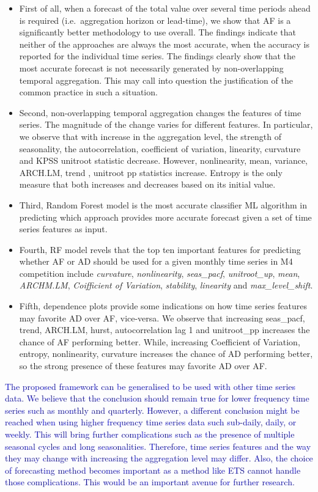 \documentclass[preprint, 3p,
authoryear]{elsarticle} %
\begin{document}
\begin{itemize}
\item
  First of all, when a forecast of the total value over several time
  periods ahead is required (i.e.~aggregation horizon or lead-time), we
  show that AF is a significantly better methodology to use overall. The
  findings indicate that neither of the approaches are always the most
  accurate, when the accuracy is reported for the individual time
  series. The findings clearly show that the most accurate forecast is
  not necessarily generated by non-overlapping temporal aggregation.
  This may call into question the justification of the common practice
  in such a situation.
\item
  Second, non-overlapping temporal aggregation changes the features of
  time series. The magnitude of the change varies for different
  features. In particular, we observe that with increase in the
  aggregation level, the strength of seasonality, the autocorrelation,
  coefficient of variation, linearity, curvature and KPSS unitroot
  statistic decrease. However, nonlinearity, mean, variance, ARCH.LM,
  trend , unitroot pp statistics increase. Entropy is the only measure
  that both increases and decreases based on its initial value.
\item
  Third, Random Forest model is the most accurate classifier ML
  algorithm in predicting which approach provides more accurate forecast
  given a set of time series features as input.
\item
  Fourth, RF model revels that the top ten important features for
  predicting whether AF or AD should be used for a given monthly time
  series in M4 competition include \emph{curvature},
  \emph{nonlinearity}, \emph{seas\_pacf}, \emph{unitroot\_up},
  \emph{mean}, \emph{ARCHM.LM}, \emph{Coifficient of Variation},
  \emph{stability}, \emph{linearity} and \emph{max\_level\_shift}.
\item
  Fifth, dependence plots provide some indications on how time series
  features may favorite AD over AF, vice-versa. We observe that
  increasing seas\_pacf, trend, ARCH.LM, hurst, autocorrelation lag 1
  and unitroot\_pp increases the chance of AF performing better. While,
  increasing Coefficient of Variation, entropy, nonlinearity, curvature
  increases the chance of AD performing better, so the strong presence
  of these features may favorite AD over AF.
\end{itemize}

\textcolor{blue}{The proposed framework can be generalised to be used with other time series data. We believe that the conclusion should remain true for lower frequency time series such as monthly and quarterly. However, a different conclusion might be reached when using higher frequency time series data such sub-daily, daily, or weekly. This will bring further complications such as the presence of multiple seasonal cycles and long seasonalities. Therefore, time series features and the way they may change with increasing the aggregation level may differ. Also, the choice of forecasting method becomes important as a method like ETS cannot handle those complications. This would be an important avenue for further research.}
\end{document}
